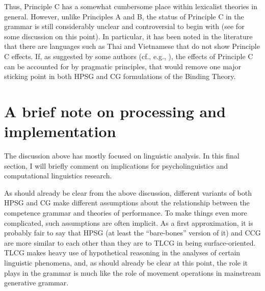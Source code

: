 \documentclass[output=paper
                ,modfonts
                ,nonflat
	        ,collection
	        ,collectionchapter
	        ,collectiontoclongg
 	        ,biblatex
                ,babelshorthands
                ,newtxmath
                ,draftmode
                ,colorlinks, citecolor=brown
]{./langsci/langscibook}
\begin{document}

Thus, Principle C has a somewhat cumbersome place within lexicalist
theories in general. However, unlike Principles A and B, the status of
Principle C in the grammar is still considerably unclear and
controversial to begin with (see \citealt[122--124]{buringbinding} for
some discussion on this point). In particular, it has been noted in
the literature \citep{lasnik86} that there are languages such as Thai
and Vietnamese that do not show Principle C effects. If, as suggested
by some authors (cf., e.g., \citealt{levinson87,levinson91}), the
effects of Principle C can be accounted for by pragmatic principles,
that would remove one major sticking point in both HPSG and CG
formulations of the Binding Theory.


\section{A brief note on processing and implementation \label{implementation}}

The discussion above has mostly focused on linguistic analysis. In
this final section, I will briefly comment on implications for
psycholinguistics and computational linguistics research.

As should already be clear from the above discussion, different
variants of both HPSG and CG make different assumptions
about the relationship between the competence grammar and theories of
performance. To make things even more complicated, such assumptions
are often implicit. As a first approximation, it is probably fair to
say that HPSG (at least the ``bare-bones'' version of it) and CCG are
more similar to each other than they are to TLCG in being
surface-oriented. TLCG makes heavy use of hypothetical reasoning in
the analyses of certain linguistic phenomena, and, as should already
be clear at this point, the role it plays in the grammar is much like
the role of movement operations in mainstream generative grammar.
\end{document}
